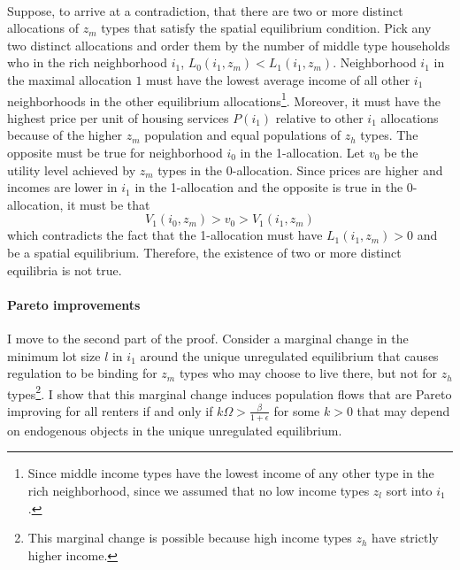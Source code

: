 \documentclass[11pt]{article}
\begin{document}
	\paragraph*{}
	Suppose, to arrive at a contradiction, that there are two or more distinct allocations of $z_{m}$ types that satisfy the spatial equilibrium condition. Pick any two distinct allocations and order them by the number of middle type households who in the rich neighborhood $i_{1}$,  $L_{0}(i_{1}, z_{m}) < L_{1}(i_{1}, z_{m})$.  Neighborhood $i_{1}$ in the maximal allocation $1$ must have the lowest average income of all other $i_{1}$ neighborhoods in the other equilibrium allocations\footnote{Since middle income types have the lowest income of any other type in the rich neighborhood, since we assumed that no low income types $z_{l}$ sort into $i_{1}$.}. Moreover, it must have the highest price per unit of housing services $P(i_{1})$ relative to other $i_{1}$ allocations because of the higher $z_{m}$ population and equal populations of $z_{h}$ types. The opposite must be true for neighborhood $i_{0}$ in the 1-allocation. Let $v_{0}$ be the utility level achieved by $z_{m}$ types in the $0$-allocation. Since prices are higher and incomes are lower in $i_{1}$ in the 1-allocation and the opposite is true in the 0-allocation, it must be that $$V_{1}(i_{0}, z_{m}) > v_{0} > V_{1}(i_{1}, z_{m})$$ which contradicts the fact that the 1-allocation must have $L_{1}(i_{1}, z_{m}) > 0$ and be a spatial equilibrium. Therefore, the existence of two or more distinct equilibria is not true.
	
	\paragraph*{Pareto improvements} I move to the second part of the proof. Consider a marginal change in the minimum lot size $l$ in $i_{1}$ around the unique unregulated equilibrium that causes regulation to be binding for $z_{m}$ types who may choose to live there, but not for $z_{h}$ types\footnote{This marginal change is possible because high income types $z_{h}$ have strictly higher income.}. I show that this marginal change induces population flows that are Pareto improving for all renters if and only if $k \Omega > \frac{\beta}{1 + \epsilon}$ for some $k > 0$ that may depend on endogenous objects in the unique unregulated equilibrium.
	
\end{document}
